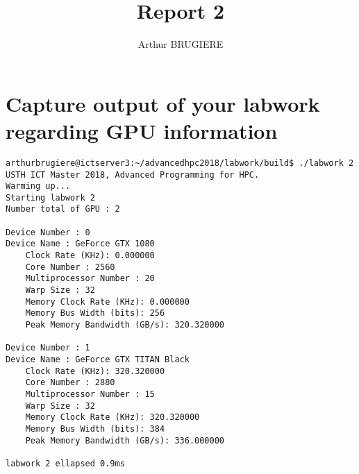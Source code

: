\documentclass[11pt]{article} %
\title{Report 2}
\author{Arthur BRUGIERE}
\begin{document}
\maketitle

\section{Capture output of your labwork regarding GPU information}

\lstset{language=Bash}
\begin{lstlisting}
arthurbrugiere@ictserver3:~/advancedhpc2018/labwork/build$ ./labwork 2
USTH ICT Master 2018, Advanced Programming for HPC.
Warming up...
Starting labwork 2
Number total of GPU : 2

Device Number : 0
Device Name : GeForce GTX 1080
	Clock Rate (KHz): 0.000000
	Core Number : 2560
	Multiprocessor Number : 20
	Warp Size : 32
	Memory Clock Rate (KHz): 0.000000
	Memory Bus Width (bits): 256
	Peak Memory Bandwidth (GB/s): 320.320000

Device Number : 1
Device Name : GeForce GTX TITAN Black
	Clock Rate (KHz): 320.320000
	Core Number : 2880
	Multiprocessor Number : 15
	Warp Size : 32
	Memory Clock Rate (KHz): 320.320000
	Memory Bus Width (bits): 384
	Peak Memory Bandwidth (GB/s): 336.000000

labwork 2 ellapsed 0.9ms
\end{lstlisting}
\end{document}

